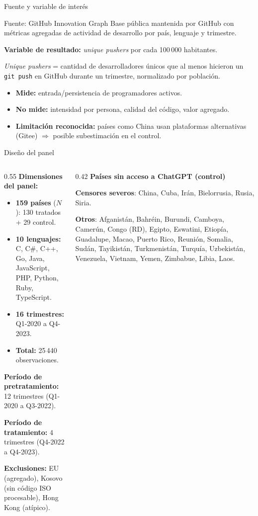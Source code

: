 \documentclass[10pt,aspectratio=169]{beamer}
\begin{document}
\begin{frame}{Fuente y variable de interés}
\begin{block}{Fuente: GitHub Innovation Graph}
Base pública mantenida por GitHub con métricas agregadas de actividad de desarrollo por país, lenguaje y trimestre.
\end{block}

\textbf{Variable de resultado:} \textit{unique pushers} por cada 100\,000 habitantes.

\medskip

\textit{Unique pushers} = cantidad de desarrolladores únicos que al menos hicieron un \texttt{git push} en GitHub durante un trimestre, normalizado por población.

\vspace{0.5em}
\begin{itemize}
  \item \textbf{Mide:} entrada/persistencia de programadores activos.
  \item \textbf{No mide:} intensidad por persona, calidad del código, valor agregado.
  \item \textbf{Limitación reconocida:} países como China usan plataformas alternativas (Gitee) $\Rightarrow$ posible subestimación en el control.
\end{itemize}
\end{frame}

\begin{frame}{Diseño del panel}
\begin{columns}[T]
\begin{column}{0.55\textwidth}
\textbf{Dimensiones del panel:}
\begin{itemize}
  \item \textbf{159 países} ($N$): 130 tratados + 29 control.
  \item \textbf{10 lenguajes:} C, C\#, C++, Go, Java, JavaScript, PHP, Python, Ruby, TypeScript.
  \item \textbf{16 trimestres:} Q1-2020 a Q4-2023.
  \item \textbf{Total:} 25\,440 observaciones.
\end{itemize}

\medskip
\textbf{Período de pretratamiento:} 12 trimestres (Q1-2020 a Q3-2022).

\textbf{Período de tratamiento:} 4 trimestres (Q4-2022 a Q4-2023).

\medskip
\textbf{Exclusiones:} EU (agregado), Kosovo (sin código ISO procesable), Hong Kong (atípico).
\end{column}
\begin{column}{0.42\textwidth}
\textbf{Países sin acceso a ChatGPT (control)}
\medskip

\scriptsize \textbf{Censores severos}: China, Cuba, Irán, Bielorrusia, Rusia, Siria.

\textbf{Otros}: Afganistán, Bahréin, Burundi, Camboya, Camerún, Congo (RD), Egipto, Eswatini, Etiopía, Guadalupe, Macao, Puerto Rico, Reunión, Somalia, Sudán, Tayikistán, Turkmenistán, Turquía, Uzbekistán, Venezuela, Vietnam, Yemen, Zimbabue, Libia, Laos.
\end{column}
\end{columns}
\end{frame}
\end{document}
